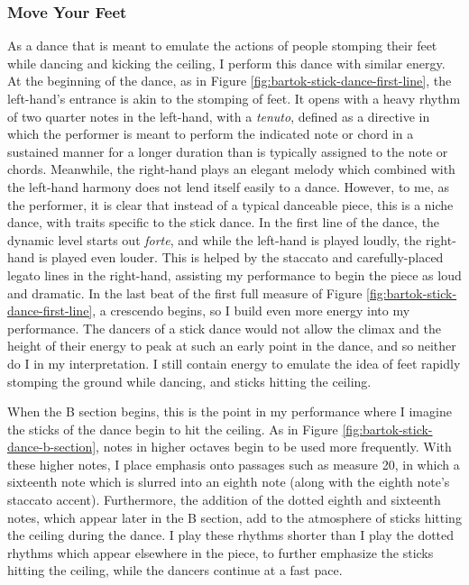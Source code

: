 \subsubsection{Move Your Feet}

As a dance that is meant to emulate the actions of people stomping their feet while dancing and kicking the ceiling, I perform this dance with similar energy. At the beginning of the dance, as in Figure \ref{fig:bartok-stick-dance-first-line}\autocite{Lung_2016}, the left-hand's entrance is akin to the stomping of feet. It opens with a heavy rhythm of two quarter notes in the left-hand, with a \textit{tenuto}, defined as a directive in which the performer is meant to perform the indicated note or chord in a sustained manner for a longer duration than is typically assigned to the note or chords. Meanwhile, the right-hand plays an elegant melody which combined with the left-hand harmony does not lend itself easily to a dance. However, to me, as the performer, it is clear that instead of a typical danceable piece, this is a niche dance, with traits specific to the stick dance. In the first line of the dance, the dynamic level starts out \textit{forte}, and while the left-hand is played loudly, the right-hand is played even louder. This is helped by the staccato and carefully-placed legato lines in the right-hand, assisting my performance to begin the piece as loud and dramatic. In the last beat of the first full measure of Figure \ref{fig:bartok-stick-dance-first-line}\autocite{Lung_2016}, a crescendo begins, so I build even more energy into my performance. The dancers of a stick dance would not allow the climax and the height of their energy to peak at such an early point in the dance, and so neither do I in my interpretation. I still contain energy to emulate the idea of feet rapidly stomping the ground while dancing, and sticks hitting the ceiling. 

When the B section begins, this is the point in my performance where I imagine the sticks of the dance begin to hit the ceiling. As in Figure \ref{fig:bartok-stick-dance-b-section}\autocite{Lung_2016}, notes in higher octaves begin to be used more frequently. With these higher notes, I place emphasis onto passages such as measure 20, in which a sixteenth note which is slurred into an eighth note (along with the eighth note's staccato accent). Furthermore, the addition of the dotted eighth and sixteenth notes, which appear later in the B section, add to the atmosphere of sticks hitting the ceiling during the dance. I play these rhythms shorter than I play the dotted rhythms which appear elsewhere in the piece, to further emphasize the sticks hitting the ceiling, while the dancers continue at a fast pace. 

